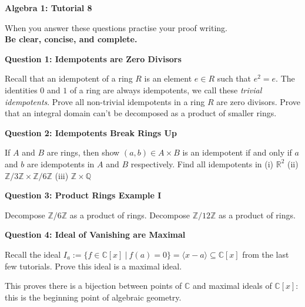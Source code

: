 \documentclass[11pt,twoside, a4paper]{report}
\theoremstyle{plain}
\theoremstyle{definition}
\begin{document}
\begin{center}
 \noindent\makebox[\linewidth]{\rule{14cm}{1.5pt}} 
{\bf Algebra 1: Tutorial 8 }
 \noindent\makebox[\linewidth]{\rule{14cm}{1.5pt}}  
 \noindent\makebox[\linewidth]{\rule{14cm}{3pt}}
\end{center}

\noindent When you answer these questions practise your proof writing.\\
  {\bf Be clear, concise, and complete.}
  
  
\begin{center}
{\bf Question 1: Idempotents are Zero Divisors}
\end{center}

Recall that an idempotent of a ring $R$ is an element $e \in R$ such that $e^{2}=e$. The identities $0$ and $1$ of a ring are always idempotents, we call these \emph{trivial idempotents}. Prove all non-trivial idempotents in a ring $R$ are zero divisors. Prove that an integral domain can't be decomposed as a product of smaller rings. 



\begin{center}
{\bf Question 2: Idempotents Break Rings Up}
\end{center} 

If $A$ and $B$ are rings, then show $(a,b) \in A\times B$ is an idempotent if and only if $a$ and $b$ are idempotents in $A$ and $B$ respectively. Find all idempotents in (i) $\mathbb{R}^{2}$ (ii) $\mathbb{Z}/3\mathbb{Z} \times \mathbb{Z}/6\mathbb{Z}$ (iii) $\mathbb{Z}\times\mathbb{Q}$

\begin{center}
{\bf Question 3: Product Rings Example I}
\end{center}

Decompose $\mathbb{Z}/6\mathbb{Z}$ as a product of rings. Decompose $\mathbb{Z}/12\mathbb{Z}$ as a product of rings. 


\begin{center}
{\bf Question 4: Ideal of Vanishing are Maximal}
\end{center}

Recall the ideal $I_{a}:=\{ f \in \mathbb{C}[x] \ | \ f(a) = 0 \} = \langle x-a \rangle \subseteq \mathbb{C}[x]$ from the last few tutorials. Prove this ideal is a maximal ideal. 

This proves there is a bijection between points of $\mathbb{C}$ and maximal ideals of $\mathbb{C}[x]$: this is the beginning point of algebraic geometry. 
\end{document}
